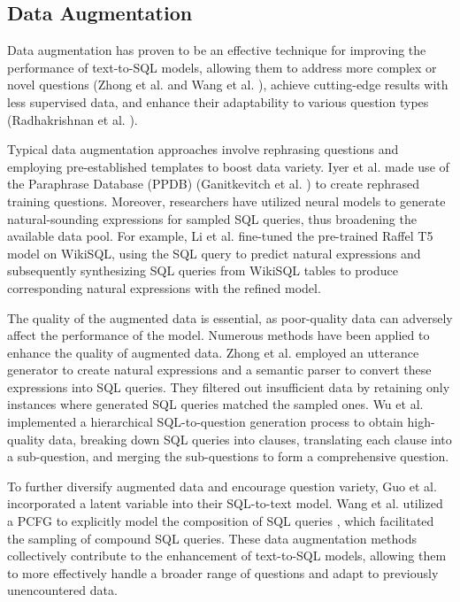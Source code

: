 \subsection{Data Augmentation}
\label{sec:augmentation}

Data augmentation has proven to be an effective technique for improving the performance of text-to-SQL models, allowing them to address more complex or novel questions (Zhong et al. \cite{zhong_semantic_2020} and Wang et al. \cite{wang_rat_sql_2021}), achieve cutting-edge results with less supervised data, and enhance their adaptability to various question types (Radhakrishnan et al. \cite{DBLP:journals/corr/abs-2010-09927}).

Typical data augmentation approaches involve rephrasing questions and employing pre-established templates to boost data variety. Iyer et al. \cite{iyer-etal-2017-learning} made use of the Paraphrase Database (PPDB) (Ganitkevitch et al. \cite{ganitkevitch-etal-2013-ppdb}) to create rephrased training questions. Moreover, researchers have utilized neural models to generate natural-sounding expressions for sampled SQL queries, thus broadening the available data pool. For example, Li et al. \cite{raffel_exploring_2020} fine-tuned the pre-trained Raffel T5 model \cite{raffel_exploring_2020} on WikiSQL, using the SQL query to predict natural expressions and subsequently synthesizing SQL queries from WikiSQL tables to produce corresponding natural expressions with the refined model.

The quality of the augmented data is essential, as poor-quality data can adversely affect the performance of the model\cite{DBLP:journals/corr/abs-2009-13845}. Numerous methods have been applied to enhance the quality of augmented data. Zhong et al. \cite{zhong_semantic_2020} employed an utterance generator to create natural expressions and a semantic parser to convert these expressions into SQL queries. They filtered out insufficient data by retaining only instances where generated SQL queries matched the sampled ones. Wu et al. \cite{DBLP:journals/corr/abs-2009-13845} implemented a hierarchical SQL-to-question generation process to obtain high-quality data, breaking down SQL queries into clauses, translating each clause into a sub-question, and merging the sub-questions to form a comprehensive question.

To further diversify augmented data and encourage question variety, Guo et al. \cite{DBLP:journals/corr/abs-1905-08205} incorporated a latent variable into their SQL-to-text model. Wang et al. utilized a \ac{PCFG} to explicitly model the composition of SQL queries \cite{yang-etal-2021-pcfgs}, which facilitated the sampling of compound SQL queries. These data augmentation methods collectively contribute to the enhancement of text-to-SQL models, allowing them to more effectively handle a broader range of questions and adapt to previously unencountered data.